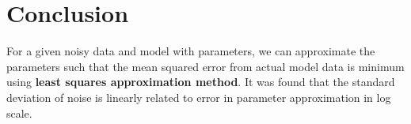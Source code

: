 \documentclass[12pt, a4paper]{report}
\begin{document}
\section*{Conclusion}
 For a given noisy data and model with parameters, we can approximate the parameters such that the mean squared error from actual model data is minimum using \textbf{least squares approximation method}. It was found that the standard deviation of noise is linearly related to error in parameter approximation in log scale.
\end{document}
